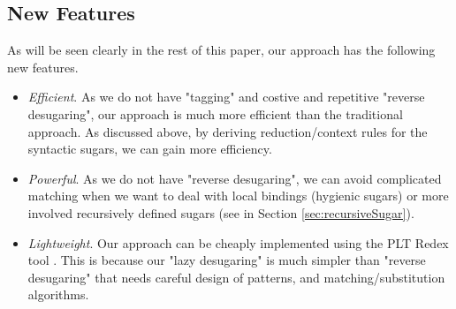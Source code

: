 \subsection{New Features}

As will be seen clearly in the rest of this paper, our approach has the following new features.
\begin{itemize}
  \item {\em Efficient}. As we do not have "tagging" and costive and repetitive "reverse desugaring", our approach is much more efficient than the traditional approach. As discussed above, by deriving reduction/context rules for the syntactic sugars, we can gain more efficiency.

  \item {\em Powerful}. As we do not have "reverse desugaring", we can avoid complicated matching when we want to deal with local bindings (hygienic sugars) or more involved recursively defined sugars (see  in Section \ref{sec:recursiveSugar}).

  \item {\em Lightweight}. Our approach can be cheaply implemented using the PLT Redex tool \cite{SEwPR}. This is because our "lazy desugaring" is much simpler than "reverse desugaring" that needs careful design of patterns, and matching/substitution algorithms.

\end{itemize}
